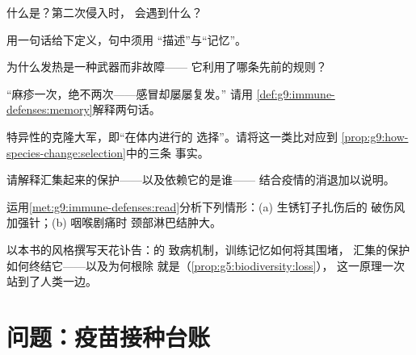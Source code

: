 \begin{exercise}[$\star$]\label{exo:g9:immune-defenses:5}
什么是？第二次侵入时，
会遇到什么？
\end{exercise}

\begin{exercise}[$\star$]\label{exo:g9:immune-defenses:6}
用一句话给下定义，句中须用
“描述”与“记忆”。
\end{exercise}

\begin{exercise}[$\star\star$]\label{exo:g9:immune-defenses:7}
为什么发热是一种武器而非故障——
它利用了哪条先前的规则？
\end{exercise}

\begin{exercise}[$\star\star$]\label{exo:g9:immune-defenses:8}
“麻疹一次，绝不两次——感冒却屡屡复发。”
请用
\cref{def:g9:immune-defenses:memory}解释两句话。
\end{exercise}

\begin{exercise}[$\star\star$]\label{exo:g9:immune-defenses:9}
特异性的克隆大军，即“在体内进行的
选择”。请将这一类比对应到
\cref{prop:g9:how-species-change:selection}中的三条
事实。
\end{exercise}

\begin{exercise}[$\star\star$]\label{exo:g9:immune-defenses:10}
请解释汇集起来的保护——以及依赖它的是谁——
结合疫情的消退加以说明。
\end{exercise}

\begin{exercise}[$\star\star$]\label{exo:g9:immune-defenses:11}
运用\cref{met:g9:immune-defenses:read}分析下列情形：(a) 生锈钉子扎伤后的
破伤风加强针；(b) 咽喉剧痛时
颈部淋巴结肿大。
\end{exercise}

\begin{exercise}[$\star\star\star$]\label{exo:g9:immune-defenses:12}
以本书的风格撰写天花讣告：的
致病机制，训练记忆如何将其围堵，
汇集的保护如何终结它——以及为何根除
就是（\cref{prop:g5:biodiversity:loss}），
这一原理一次站到了人类一边。
\end{exercise}

\section{问题：疫苗接种台账}

